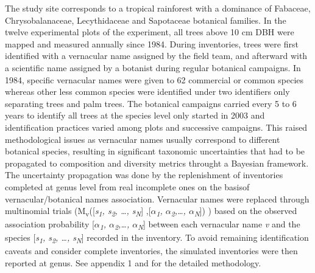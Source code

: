 \documentclass[fleqn,10pt]{ArtEcoFoG} %
\begin{document}
The study site corresponds to a tropical rainforest with a dominance of
Fabaceae, Chrysobalanaceae, Lecythidaceae and Sapotaceae botanical
families. In the twelve experimental plots of the experiment, all trees
above 10 cm DBH were mapped and measured annually since 1984. During
inventories, trees were first identified with a vernacular name assigned
by the field team, and afterward with a scientific name assigned by a
botanist during regular botanical campaigns. In 1984, specific
vernacular names were given to 62 commercial or common species whereas
other less common species were identified under two identifiers only
separating trees and palm trees. The botanical campaigns carried every 5
to 6 years to identify all trees at the species level only started in
2003 and identification practices varied among plots and successive
campaigns. This raised methodological issues as vernacular names usually
correspond to different botanical species, resulting in significant
taxonomic uncertainties that had to be propagated to composition and
diversity metrics throught a Bayesian framework. The uncertainty
propagation was done by the replenishment of inventories completed at
genus level from real incomplete ones on the basisof
vernacular/botanical names association. Vernacular names were replaced
through multinomial trials
(M\textsubscript{v}({[}\emph{s\textsubscript{1}, s\textsubscript{2},
\ldots{}, s\textsubscript{N}}{]} ,{[}\emph{\(\alpha\)\textsubscript{1},
\(\alpha\)\textsubscript{2},\ldots{}, \(\alpha\)\textsubscript{N}}{]}) )
based on the observed association probability
{[}\emph{\(\alpha\)\textsubscript{1},
\(\alpha\)\textsubscript{2},\ldots{}, \(\alpha\)\textsubscript{N}}{]}
between each vernacular name \emph{v} and the species
{[}\emph{s\textsubscript{1}, s\textsubscript{2}, \ldots{},
s\textsubscript{N}}{]} recorded in the inventory. To avoid remaining
identification caveats and consider complete inventories, the simulated
inventories were then reported at genus. See appendix 1 and
\citet{Aubry-Kientz2013} for the detailed methodology.
\end{document}
